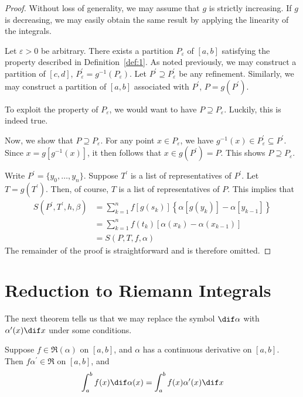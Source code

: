 \documentclass[thmcnt=section, color=blue, 12pt]{my-elegantbook}
\begin{document}
\begin{proof}
	Without loss of generality, we may assume that $g$ is strictly increasing.
	If $g$ is decreasing, we may easily obtain the same result
	by applying the linearity of the integrals.

	Let $\varepsilon > 0$ be arbitrary.
	There exists a partition $P_\varepsilon$ of $[a, b]$ satisfying
	the property described in Definition~\ref{def:1}.
	As noted previously, we may construct a partition of $[c, d]$,
	$P^\prime_\varepsilon = g^{-1}(P_\varepsilon)$.
	Let $P^\prime \supseteq P^\prime_\varepsilon$ be any refinement.
	Similarly, we may construct a partition of $[a, b]$
	associated with $P^\prime$, $P = g(P^\prime)$.

	\begin{note}
		To exploit the property of $P_\varepsilon$,
		we would want to have $P \supseteq P_\varepsilon$.
		Luckily, this is indeed true.
	\end{note}

	Now, we show that $P \supseteq P_\varepsilon$.
	For any point $x \in P_\varepsilon$,
	we have $g^{-1}(x) \in P^\prime_\varepsilon \subseteq P^\prime$.
	Since $x = g[g^{-1}(x)]$,
	it then follows that $x \in g(P^\prime) = P$.
	This shows $P \supseteq P_\varepsilon$.

	Write $P^\prime = \{y_0, \ldots, y_n\}$.
	Suppose $T^\prime$ is a list of representatives of $P^\prime$.
	Let $T = g(T^\prime)$.
	Then, of course, $T$ is a list of representatives of $P$.
	This implies that
	\begin{align*}
		S(P^\prime, T^\prime, h, \beta)
		 & = \sum_{k=1}^n f[g(s_k)] \left\{ \alpha[g(y_k)] - \alpha[y_{k-1}] \right\} \\
		 & = \sum_{k=1}^n f(t_k) [ \alpha(x_k) - \alpha(x_{k-1}) ]                    \\
		 & = S(P, T, f, \alpha)
	\end{align*}
	The remainder of the proof is straightforward and is therefore omitted.
\end{proof}

\section{Reduction to Riemann Integrals}

The next theorem tells us that we may replace
the symbol $\dif \alpha$ with $\alpha^\prime(x) \dif x$
under some conditions.

\begin{theorem} \label{thm:8}
	Suppose $f \in \mathfrak{R}(\alpha)$ on $[a, b]$,
	and $\alpha$ has a continuous derivative on $[a, b]$.
	Then $f \alpha^\prime \in \mathfrak{R}$ on $[a, b]$, and
	\begin{align*}
		\int_a^b f(x) \dif \alpha(x)
		= \int_a^b f(x) \alpha^\prime(x) \dif x
	\end{align*}
\end{theorem}
\end{document}
